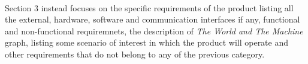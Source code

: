 		\paragraph*{}Section 3 instead focuses on the specific requirements of the product listing all the external, hardware, software and communication interfaces if any, functional and non-functional requiremnets, the description of \emph{The World and The Machine} graph, listing some scenario of interest in which the product will operate and other requirements that do not belong to any of the previous category. 
	
	